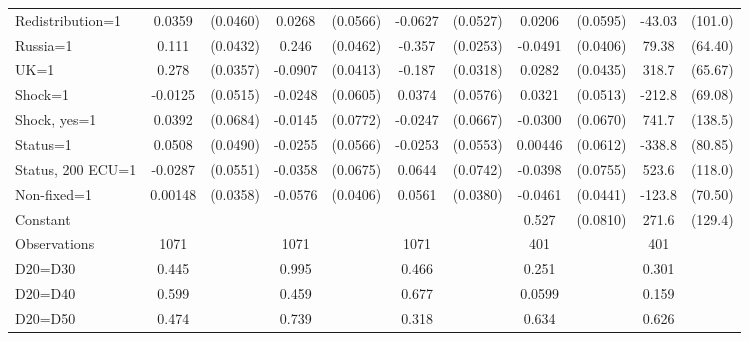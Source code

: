 \begin{tabular}{l|cccccc|cc|cc}
Redistribution=1&   0.0359         & (0.0460)&   0.0268         & (0.0566)&  -0.0627         & (0.0527)&   0.0206         & (0.0595)&   -43.03         &  (101.0)\\
Russia=1        &    0.111\sym{**} & (0.0432)&    0.246\sym{***}& (0.0462)&   -0.357\sym{***}& (0.0253)&  -0.0491         & (0.0406)&    79.38         &  (64.40)\\
UK=1            &    0.278\sym{***}& (0.0357)&  -0.0907\sym{**} & (0.0413)&   -0.187\sym{***}& (0.0318)&   0.0282         & (0.0435)&    318.7\sym{***}&  (65.67)\\
Shock=1         &  -0.0125         & (0.0515)&  -0.0248         & (0.0605)&   0.0374         & (0.0576)&   0.0321         & (0.0513)&   -212.8\sym{***}&  (69.08)\\
Shock, yes=1    &   0.0392         & (0.0684)&  -0.0145         & (0.0772)&  -0.0247         & (0.0667)&  -0.0300         & (0.0670)&    741.7\sym{***}&  (138.5)\\
Status=1        &   0.0508         & (0.0490)&  -0.0255         & (0.0566)&  -0.0253         & (0.0553)&  0.00446         & (0.0612)&   -338.8\sym{***}&  (80.85)\\
Status, 200 ECU=1&  -0.0287         & (0.0551)&  -0.0358         & (0.0675)&   0.0644         & (0.0742)&  -0.0398         & (0.0755)&    523.6\sym{***}&  (118.0)\\
Non-fixed=1     &  0.00148         & (0.0358)&  -0.0576         & (0.0406)&   0.0561         & (0.0380)&  -0.0461         & (0.0441)&   -123.8\sym{*}  &  (70.50)\\
Constant        &                  &         &                  &         &                  &         &    0.527\sym{***}& (0.0810)&    271.6\sym{**} &  (129.4)\\
\hline
Observations    &     1071         &         &     1071         &         &     1071         &         &      401         &         &      401         &         \\
D20=D30         &    0.445         &         &    0.995         &         &    0.466         &         &    0.251         &         &    0.301         &         \\
D20=D40         &    0.599         &         &    0.459         &         &    0.677         &         &   0.0599         &         &    0.159         &         \\
D20=D50         &    0.474         &         &    0.739         &         &    0.318         &         &    0.634         &         &    0.626         &         \\

\end{tabular}
